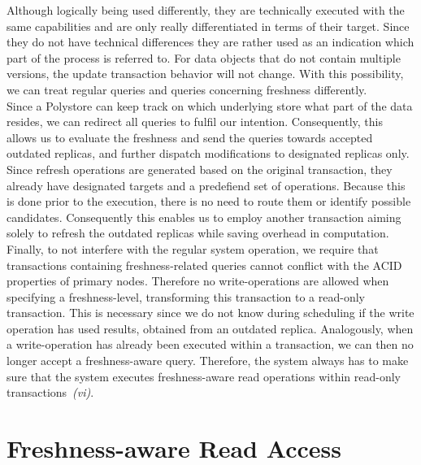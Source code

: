 Although logically being used differently, they are technically executed with the same capabilities and are only really differentiated in terms of their target.
Since they do not have technical differences they are rather used as an indication which part of the process is referred to.
For data objects that do not contain multiple versions, the update transaction behavior will not change.
With this possibility, we can treat regular queries and queries concerning freshness differently.\\
Since a Polystore can keep track on which 
underlying store what part of the data resides, we can redirect all queries to fulfil our intention. Consequently, this allows us to evaluate the freshness
and send the queries towards accepted outdated replicas, and further dispatch modifications to designated replicas only.\\
Since refresh operations are generated based on the original transaction, they already have designated targets and a predefiend set of operations.
Because this is done prior to the execution, there is no need to route them or identify possible candidates.
Consequently this enables us to employ another transaction aiming solely to refresh the outdated replicas while saving overhead in computation.\\
Finally, to not interfere with the regular system operation, we require that transactions containing freshness-related queries cannot conflict with the ACID properties 
of primary nodes. Therefore no write-operations are allowed when specifying a freshness-level, transforming this transaction to a read-only transaction.
This is necessary since we do not know during scheduling if the write operation has used results, obtained from an outdated replica.
Analogously, when a write-operation has already been executed within a transaction, we can then no longer accept a freshness-aware query. 
Therefore, the system always has to make sure that the system executes freshness-aware read operations within read-only transactions~\textit{(vi)}. 






\section{Freshness-aware Read Access}
\label{sec:read_access}

